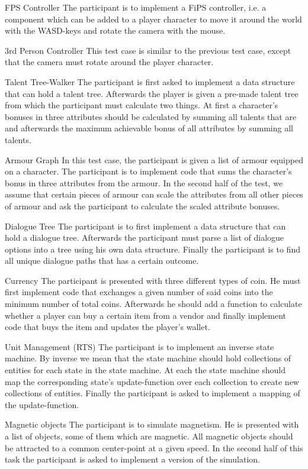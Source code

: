 \begin{labeling}{\quad\quad}
    \item[FPS Controller] The participant is to implement a \gls{FiPS} controller, i.e. a component which can be added to a player character to move it around the world with the WASD-keys and rotate the camera with the mouse.
    \item[3rd Person Controller] This test case is similar to the previous test case, except that the camera must rotate around the player character.
    \item[Talent Tree-Walker] The participant is first asked to implement a data structure that can hold a talent tree. Afterwards the player is given a pre-made talent tree from which the participant must calculate two things. At first a character's bonuses in three attributes should be calculated by summing all talents that are  and afterwards the maximum achievable bonus of all attributes by summing all talents.
    \item[Armour Graph] In this test case, the participant is given a list of armour equipped on a character. The participant is to implement code that sums the character's bonus in three attributes from the armour. In the second half of the test, we assume that certain pieces of armour can scale the attributes from all other pieces of armour and ask the participant to calculate the scaled attribute bonuses.
    \item[Dialogue Tree] The participant is to first implement a data structure that can hold a dialogue tree. Afterwards the participant must parse a list of dialogue options into a tree using his own data structure. Finally the participant is to find all unique dialogue paths that has a certain outcome.
    \item[Currency] The participant is presented with three different types of coin. He must first implement code that exchanges a given number of said coins into the minimum number of total coins. Afterwards he should add a function to calculate whether a player can buy a certain item from a vendor and finally implement code that buys the item and updates the player's wallet.
    \item[Unit Management (RTS)] The participant is to implement an inverse state machine. By inverse we mean that the state machine should hold collections of entities for each state in the state machine. At each  the state machine should map the corresponding state's update-function over each collection to create new collections of entities. Finally the participant is asked to implement a  mapping of the update-function.
    \item[Magnetic objects] The participant is to simulate magnetism. He is presented with a list of objects, some of them which are magnetic. All magnetic objects should be attracted to a common center-point at a given speed. In the second half of this task the participant is asked to implement a  version of the simulation.
\end{labeling}

